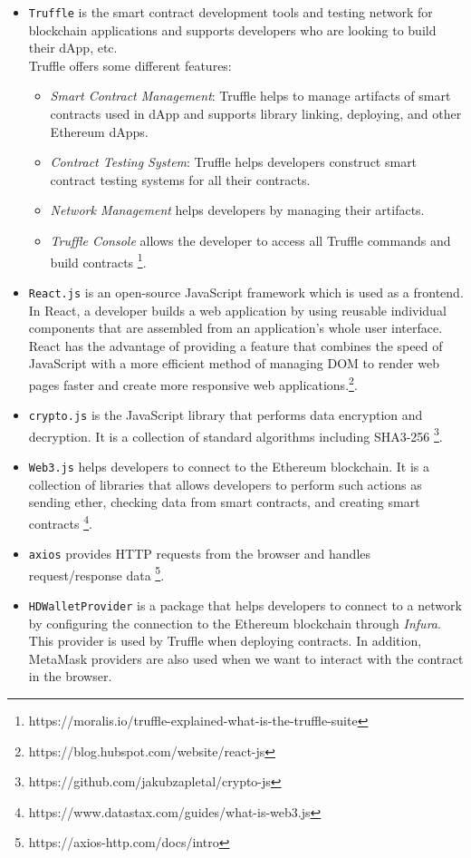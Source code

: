 \begin{itemize}
  \item \texttt{Truffle} is the smart contract development tools and testing network for blockchain applications and supports developers who are looking to build their dApp, etc. \\
   Truffle offers some different features:
 \begin{itemize}
\item\textit{Smart Contract Management}: Truffle helps to manage artifacts of smart contracts used in dApp and supports library linking, deploying, and other Ethereum dApps. \\
 \item\textit{Contract Testing System}: Truffle helps developers construct smart contract testing systems for all their contracts. \\
 \item\textit{Network Management} helps developers by managing their artifacts. \\
 \item\textit{Truffle Console} allows the developer to access all Truffle commands and build contracts \footnote{https://moralis.io/truffle-explained-what-is-the-truffle-suite}.
 \end{itemize}

\item \texttt{React.js} is an open-source JavaScript framework which is used as a frontend. In React, a developer builds a web application by using reusable individual components that are assembled from an application's whole user interface.\\
React has the advantage of providing a feature that combines the speed of JavaScript with a more efficient method of managing DOM to render web pages faster and create more responsive web applications.\footnote{https://blog.hubspot.com/website/react-js}.\\
\item \texttt{crypto.js} is the JavaScript library that performs data encryption and decryption. It is a collection of standard algorithms including SHA3-256 \footnote{{https://github.com/jakubzapletal/crypto-js}}.
\item \texttt{Web3.js} helps developers to connect to the Ethereum blockchain. It is a collection of libraries that allows developers to perform such actions as sending ether, checking data from smart contracts, and creating smart contracts \footnote{https://www.datastax.com/guides/what-is-web3.js}.\\
\item \texttt{axios} provides HTTP requests from the browser and handles request/response data \footnote{https://axios-http.com/docs/intro}.\\
\item \texttt{HDWalletProvider} is a package that helps developers to connect to a network by configuring the connection to the Ethereum blockchain through \textit{Infura}. This provider is used by Truffle when deploying contracts. In addition, MetaMask providers are also used when we want to interact with the contract in the browser. 


\end{itemize}
